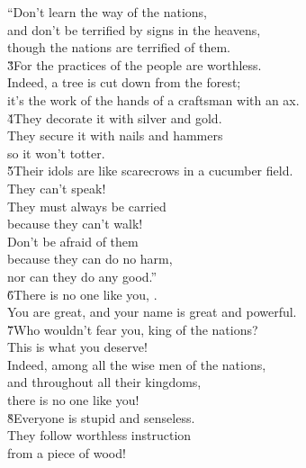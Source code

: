 \begin{poetry}
\poeml ``Don't learn the way of the nations, \\
\poemll    and don't be terrified by signs in the heavens, \\
\poemll    though the nations are terrified of them. \\
\poeml \v{3}For the practices of the people are worthless. \\
\poemll    Indeed, a tree is cut down from the forest; \\
\poemlll       it's the work of the hands of a craftsman with an ax. \\
\poeml \v{4}They decorate it with silver and gold. \\
\poemll    They secure it with nails and hammers \\
\poemlll       so it won't totter. \\
\poeml \v{5}Their idols are like scarecrows in a cucumber field. \\
\poemll    They can't speak! \\
\poeml They must always be carried \\
\poemll    because they can't walk! \\
\poeml Don't be afraid of them \\
\poemll    because they can do no harm, \\
\poemlll       nor can they do any good.'' \\
\poeml \v{6}There is no one like you, . \\
\poemll    You are great, and your name is great and powerful. \\
\poeml \v{7}Who wouldn't fear you, king of the nations? \\
\poemll    This is what you deserve! \\
\poeml Indeed, among all the wise men of the nations, \\
\poemll    and throughout all their kingdoms, \\
\poemlll       there is no one like you! \\
\poeml \v{8}Everyone is stupid and senseless. \\
\poemll    They follow worthless instruction \\
\poemlll       from a piece of wood! \\

\end{poetry}

